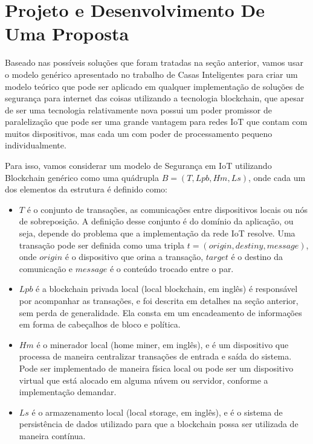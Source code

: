 \section{Projeto e Desenvolvimento De Uma Proposta}

Baseado nas possíveis soluções que foram tratadas na seção anterior, vamos usar o modelo genérico apresentado no trabalho de Casas Inteligentes \cite{dorri2017blockchain} para criar um modelo teórico que pode ser aplicado em qualquer implementação de soluções de segurança para internet das coisas utilizando a tecnologia blockchain, que apesar de ser uma tecnologia relativamente nova possui um poder promissor de paralelização que pode ser uma grande vantagem para redes IoT que contam com muitos dispositivos, mas cada um com poder de processamento pequeno individualmente.

Para isso, vamos considerar um modelo de Segurança em IoT utilizando Blockchain genérico como uma quádrupla $B = (T, Lpb, Hm, Ls)$, onde cada um dos elementos da estrutura é definido como:

\begin{itemize}
    \item $T$ é o conjunto de transações, as comunicações entre dispositivos locais ou nós de sobreposição. A definição desse conjunto é do domínio da aplicação, ou seja, depende do problema que a implementação da rede IoT resolve. Uma transação pode ser definida como uma tripla $t = (origin, destiny, message)$, onde $origin$ é o dispositivo que orina a transação, $target$ é o destino da comunicação e $message$ é o conteúdo trocado entre o par.
    
    \item $Lpb$ é a blockchain privada local (local blockchain, em inglês) é responsável por acompanhar as transações, e foi descrita em detalhes na seção anterior, sem perda de generalidade. Ela consta em um encadeamento de informações em forma de cabeçalhos de bloco e política.
    
    \item $Hm$ é o minerador local (home miner, em inglês), e é um dispositivo que processa de maneira centralizar transações de entrada e saída do sistema. Pode ser implementado de maneira física local ou pode ser um dispositivo virtual que está alocado em alguma núvem ou servidor, conforme a implementação demandar.
    
    \item $Ls$ é o armazenamento local (local storage, em inglês), e é o sistema de persistência de dados utilizado para que a blockchain possa ser utilizada de maneira contínua.
\end{itemize}{}

